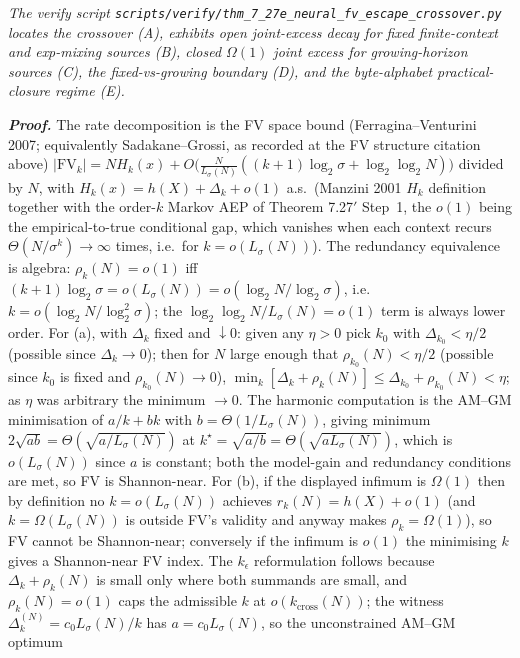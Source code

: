 \documentclass[
]{article}
\begin{document}
\emph{The verify script
\texttt{scripts/verify/thm\_7\_27e\_neural\_fv\_escape\_crossover.py}
locates the crossover (A), exhibits open joint-excess decay for fixed
finite-context and exp-mixing sources (B), closed $\Omega(1)$ joint
excess for growing-horizon sources (C), the fixed-vs-growing boundary
(D), and the byte-alphabet practical-closure regime (E).}

\emph{\textbf{Proof.}} The rate decomposition is the FV space bound
(Ferragina--Venturini 2007; equivalently Sadakane--Grossi, as recorded
at the FV structure citation above)
$|\mathrm{FV}_k| = N H_k(x) + O\bigl(\tfrac{N}{L_\sigma(N)}((k+1)\log_2
\sigma + \log_2\log_2 N)\bigr)$ divided by $N$, with $H_k(x) = h(X) +
\Delta_k + o(1)$ a.s.\ (Manzini 2001 $H_k$ definition together with the
order-$k$ Markov AEP of Theorem 7.27$'$ Step~1, the $o(1)$ being the
empirical-to-true conditional gap, which vanishes when each context
recurs $\Theta(N/\sigma^k) \to \infty$ times, i.e.\ for $k = o(L_\sigma
(N))$). The redundancy equivalence is algebra: $\rho_k(N) = o(1)$ iff
$(k+1)\log_2\sigma = o(L_\sigma(N)) = o(\log_2 N/\log_2\sigma)$, i.e.\
$k = o(\log_2 N/\log_2^2\sigma)$; the $\log_2\log_2 N / L_\sigma(N) =
o(1)$ term is always lower order. For (a), with $\Delta_k$ fixed and
$\downarrow 0$: given any $\eta > 0$ pick $k_0$ with $\Delta_{k_0} <
\eta/2$ (possible since $\Delta_k \to 0$); then for $N$ large enough that
$\rho_{k_0}(N) < \eta/2$ (possible since $k_0$ is fixed and $\rho_{k_0}
(N) \to 0$), $\min_k[\Delta_k + \rho_k(N)] \leq \Delta_{k_0} +
\rho_{k_0}(N) < \eta$; as $\eta$ was arbitrary the minimum $\to 0$. The
harmonic computation is the AM--GM minimisation of $a/k + bk$ with $b =
\Theta(1/L_\sigma(N))$, giving minimum $2\sqrt{ab} = \Theta(\sqrt{a/
L_\sigma(N)})$ at $k^\star = \sqrt{a/b} = \Theta(\sqrt{a L_\sigma(N)})$,
which is $o(L_\sigma(N))$ since $a$ is constant; both the model-gain and
redundancy conditions are met, so FV is Shannon-near. For (b), if the
displayed infimum is $\Omega(1)$ then by definition no $k = o(L_\sigma
(N))$ achieves $r_k(N) = h(X) + o(1)$ (and $k = \Omega(L_\sigma(N))$ is
outside FV's validity and anyway makes $\rho_k = \Omega(1)$), so FV
cannot be Shannon-near; conversely if the infimum is $o(1)$ the
minimising $k$ gives a Shannon-near FV index. The $k_\epsilon$
reformulation follows because $\Delta_k + \rho_k(N)$ is small only where
both summands are small, and $\rho_k(N) = o(1)$ caps the admissible $k$
at $o(k_{\mathrm{cross}}(N))$; the witness $\Delta_k^{(N)} = c_0 L_\sigma
(N)/k$ has $a = c_0 L_\sigma(N)$, so the unconstrained AM--GM optimum
\end{document}
